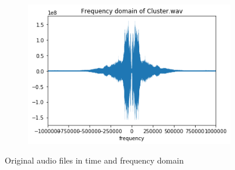\documentclass{article}
\begin{document}
\begin{figure}[h!]
\begin{subfigure}{0.45\textwidth}
    \end{subfigure}%
    \begin{subfigure}{0.45\textwidth}
      \includegraphics[width=\textwidth]{Cluster_freq.png}
    \end{subfigure}
    \caption{Original audio files in time and frequency domain}
    \label{fig:mylabel}
\end{figure}
\end{document}
